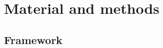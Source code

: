 \documentclass[11pt,a4paper]{article}
\begin{document}
%
%
%

\section{Material and methods}
\label{sec:methods}

\subsection{Framework}
\label{sec:framework}
\end{document}
